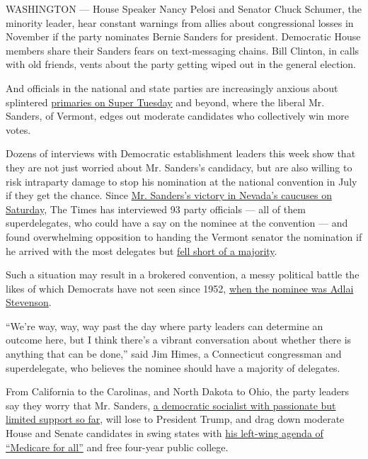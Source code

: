 WASHINGTON --- House Speaker Nancy Pelosi and Senator Chuck Schumer, the
minority leader, hear constant warnings from allies about congressional
losses in November if the party nominates Bernie Sanders for president.
Democratic House members share their Sanders fears on text-messaging
chains. Bill Clinton, in calls with old friends, vents about the party
getting wiped out in the general election.

And officials in the national and state parties are increasingly anxious
about splintered
\href{https://www.nytimes3xbfgragh.onion/2020/02/27/us/politics/super-tuesday.html}{primaries
on Super Tuesday} and beyond, where the liberal Mr. Sanders, of Vermont,
edges out moderate candidates who collectively win more votes.

Dozens of interviews with Democratic establishment leaders this week
show that they are not just worried about Mr. Sanders's candidacy, but
are also willing to risk intraparty damage to stop his nomination at the
national convention in July if they get the chance. Since
\href{https://www.nytimes3xbfgragh.onion/2020/02/22/us/politics/bernie-sanders-nevada-caucus.html}{Mr.
Sanders's victory in Nevada's caucuses on Saturday}, The Times has
interviewed 93 party officials --- all of them superdelegates, who could
have a say on the nominee at the convention --- and found overwhelming
opposition to handing the Vermont senator the nomination if he arrived
with the most delegates but
\href{https://www.nytimes3xbfgragh.onion/2020/02/22/us/politics/democratic-primary-dnc-superdelegates.html}{fell
short of a majority}.

Such a situation may result in a brokered convention, a messy political
battle the likes of which Democrats have not seen since 1952,
\href{https://www.nytimes3xbfgragh.onion/2020/02/27/us/brokered-democratic-convention.html?action=click\&module=RelatedLinks\&pgtype=Article}{when
the nominee was Adlai Stevenson}.

``We're way, way, way past the day where party leaders can determine an
outcome here, but I think there's a vibrant conversation about whether
there is anything that can be done,'' said Jim Himes, a Connecticut
congressman and superdelegate, who believes the nominee should have a
majority of delegates.

From California to the Carolinas, and North Dakota to Ohio, the party
leaders say they worry that Mr. Sanders,
\href{https://www.nytimes3xbfgragh.onion/2020/02/24/us/politics/bernie-sanders-democratic-voters.html}{a
democratic socialist with passionate but limited support so far}, will
lose to President Trump, and drag down moderate House and Senate
candidates in swing states with
\href{https://www.nytimes3xbfgragh.onion/2020/02/25/upshot/medicare-for-all-basics-bernie-sanders.html}{his
left-wing agenda of ``Medicare for all''} and free four-year public
college.

